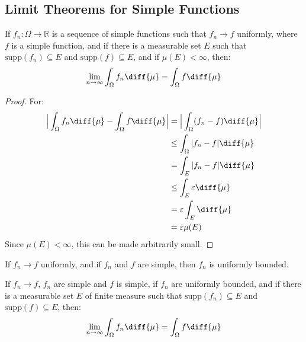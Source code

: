     \subsection{Limit Theorems for Simple Functions}
        \begin{theorem}
            If $f_{n}:\Omega\rightarrow\mathbb{R}$ is
            a sequence of simple functions such that
            $f_{n}\rightarrow{f}$ uniformly,
            where $f$ is a simple function,
            and if there is a measurable set $E$
            such that $\mathrm{supp}(f_{n})\subseteq{E}$ and
            $\mathrm{supp}(f)\subseteq{E}$, and if
            $\mu(E)<\infty$, then:
            \begin{equation}
                \underset{n\rightarrow\infty}{\lim}
                \int_{\Omega}f_{n}\diff{\mu}
                =\int_{\Omega}f\diff{\mu}
            \end{equation}
        \end{theorem}
        \begin{proof}
            For:
            \begin{align}
                \Big|
                    \int_{\Omega}f_{n}\diff{\mu}-
                    \int_{\Omega}f\diff{\mu}
                \Big|
                &=\Big|\int_{\Omega}(f_{n}-f)\diff{\mu}
                    \Big|\\
                &\leq\int_{\Omega}|f_{n}-f|\diff{\mu}\\
                &=\int_{E}|f_{n}-f|\diff{\mu}\\
                &\leq\int_{E}\varepsilon\diff{\mu}\\
                &=\varepsilon\int_{E}\diff{\mu}\\
                &=\varepsilon\mu(E)
            \end{align}
            Since $\mu(E)<\infty$, this can be made
            arbitrarily small.
        \end{proof}
        \begin{theorem}
            If $f_{n}\rightarrow{f}$ uniformly, and if
            $f_{n}$ and $f$ are simple, then
            $f_{n}$ is uniformly bounded.
        \end{theorem}
        \begin{theorem}
            If $f_{n}\rightarrow{f}$, $f_{n}$ are
            simple and $f$ is simple, if
            $f_{n}$ are uniformly bounded, and if
            there is a measurable set $E$ of finite
            measure such that $\mathrm{supp}(f_{n})\subseteq{E}$
            and $\mathrm{supp}(f)\subseteq{E}$, then:
            \begin{equation}
                \underset{n\rightarrow\infty}{\lim}
                \int_{\Omega}f_{n}\diff{\mu}
                =\int_{\Omega}f\diff{\mu}
            \end{equation}
        \end{theorem}
